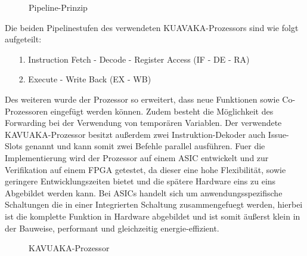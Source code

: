 \newpage
\begin{scriptsize}
	\begin{figure}[htbp] 
		\centering
		
		\caption{Pipeline-Prinzip}
		\label{fig:pipeline}
	\end{figure}
\end{scriptsize}

Die beiden Pipelinestufen des verwendeten KUAVAKA-Prozessors sind wie folgt aufgeteilt:
\begin{itemize}
	\item[1.] Instruction Fetch - Decode - Register Access (IF - DE - RA) 
	\item[2.] Execute - Write Back (EX - WB)
\end{itemize}

Des weiteren wurde der Prozessor so erweitert, dass neue Funktionen sowie Co-Prozessoren eingefügt werden können. Zudem besteht die Möglichkeit des Forwarding bei der Verwendung von temporären Variablen.
Der verwendete KAVUAKA-Prozessor besitzt außerdem zwei Instruktion-Dekoder auch Issue-Slots genannt und kann somit zwei Befehle parallel ausführen.
Fuer die Implementierung wird der Prozessor auf einem ASIC entwickelt und zur Verifikation auf einem FPGA getestet, da dieser eine hohe Flexibilität, sowie geringere Entwicklungszeiten bietet und die spätere Hardware eins zu eins Abgebildet werden kann.\cite{lukasglitches2017}
Bei ASICs handelt sich um anwendungsspezifische Schaltungen die in einer Integrierten Schaltung zusammengefuegt werden, hierbei ist die komplette Funktion in Hardware abgebildet und ist somit äußerst klein in der Bauweise, performant und gleichzeitig energie-effizient. 

\begin{scriptsize}
	\begin{figure}[htbp] 
		\centering
		
		\caption[KAVUAKA-Prozessor]{KAVUAKA-Prozessor \cite{lukasglitches2017}}
		\label{fig:KAVUAKA}
	\end{figure}
\end{scriptsize}
\newpage

